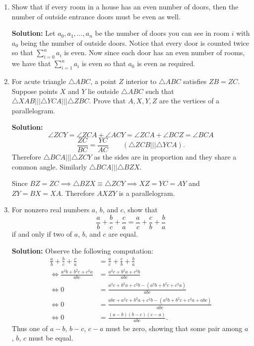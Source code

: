 \documentclass{article}
\begin{document}
\begin{enumerate}[itemsep=24pt]
\item %
Show that if every room in a house has an even number of doors, then the number of outside entrance doors must be even as well.

\textbf{Solution:}
Let $a_0, a_1, \dotsc, a_n$ be the number of doors you can see in room $i$ with $a_0$ being the number of outside doors. Notice that every door is counted twice so that $\sum_{i=0}^{n} a_i$ is even.
Now since each door has an even number of rooms, we have that $\sum_{i=1}^{n} a_i$ is even so that $a_0$ is even as required.


\item 
For acute triangle $\triangle ABC$, a point $Z$ interior to $\triangle ABC$ satisfies $ZB = ZC$.
Suppose points $X$ and $Y$ lie outside $\triangle ABC$ such that $\triangle XAB \mathrel{|||} \triangle YCA \mathrel{|||} \triangle ZBC$.
Prove that $A,X,Y,Z$ are the vertices of a parallelogram. 

\textbf{Solution:}
$$\angle ZCY = \angle ZCA + \angle ACY = \angle ZCA + \angle BCZ = \angle BCA$$
$$\frac{ZC}{BC} = \frac{YC}{AC} \qquad (\triangle ZCB \mathrel{|||} \triangle YCA).$$
Therefore $\triangle BCA \mathrel{|||} \triangle ZCY$ as the sides are in proportion and they share a common angle. Similarly $\triangle BCA \mathrel{|||} \triangle BZX$. 

Since $BZ = ZC \implies \triangle BZX \equiv \triangle ZCY \implies XZ = YC = AY$ and $ZY = BX = XA$.
Therefore $AXZY$ is a parallelogram.


\item
For nonzero real numbers $a$, $b$, and $c$, show that
\[ \frac{a}{b} +\frac{b}{c} +\frac{c}{a} = \frac{a}{c} +\frac{c}{b} +\frac{b}{a} \]
if and only if two of $a$, $b$, and $c$ are equal.

\textbf{Solution:} Observe the following computation:
\begin{align*}
  \frac{a}{b} +\frac{b}{c} +\frac{c}{a} &= \frac{a}{c} +\frac{c}{b} +\frac{b}{a} \\
  \iff \frac{a^{2}b + b^{2}c + c^{2}a}{abc} & = \frac{a^{2}c + b^{2}a + c^{2}b}{abc}\\
  \iff 0 & = \frac{a^{2}c + b^{2}a + c^{2}b -(a^{2}b + b^{2}c + c^{2}a)}{abc} \\
  \iff 0 & = \frac{abc + a^{2}c + b^{2}a + c^{2}b - (a^{2}b + b^{2}c + c^{2}a+abc)}{abc} \\
  \iff 0 & = \frac{(a-b)(b-c)(c-a)}{abc}.
\end{align*}
Thus one of $a-b$, $b-c$, $c-a$ must be zero, showing that some pair among $a$, $b$, $c$ must be equal.

\end{enumerate}
\end{document}
